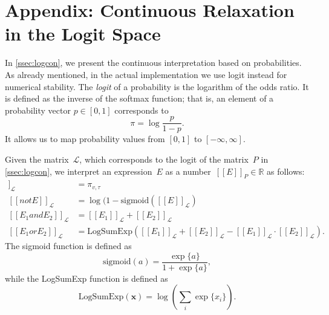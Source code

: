 \documentclass[sigplan,10pt,anonymous]{acmart} %
\newcommand{\qqpi}[2]{[\![#2]\!]_{#1}}
\theoremstyle{plain}
\theoremstyle{remark}
\theoremstyle{definition}
\begin{document}
\appendix
\section{Appendix: Continuous Relaxation in the Logit Space}\label{app:appendix-logit}

In \cref{ssec:logcon}, we present the continuous interpretation based on probabilities.
As already mentioned, in the actual implementation we use logit instead for numerical stability.
The \emph{logit} of a probability is the logarithm of the odds ratio.
It is defined as the inverse of the softmax function; that is, an element of a probability vector $p \in [0,1]$ corresponds to
\begin{equation*}
  \pi = \log \frac{p}{1 - p}.
\end{equation*}
It allows us to map probability values from $\left[ 0, 1 \right]$ to $\left[ -\infty, \infty \right]$.

Given the matrix~$\mathcal{L}$, which corresponds to the logit of the matrix~$P$ in \cref{ssec:logcon}, we interpret an expression~$E$ as a number~$\qqpi{P}{E} \in \mathbb{R}$ as  follows:
\begin{align*}
  \qqpi{\mathcal{L}}{x_v \mathrel{is} l_\tau} & = \pi_{v,\tau}                                                \\ \label{eq:logits}
  \qqpi{\mathcal{L}}{\mathrel{not} E}         & = \log(1-\text{sigmoid}(\qqpi{\mathcal{L}}{E})                \\
  \qqpi{\mathcal{L}}{E_1 \mathrel{and} E_2}   & = \qqpi{\mathcal{L}}{E_1} \mathrel{+} \qqpi{\mathcal{L}}{E_2} \\
  \qqpi{\mathcal{L}}{E_1 \mathrel{or} E_2}    & = \text{LogSumExp}(
  \qqpi{\mathcal{L}}{E_1} + \qqpi{\mathcal{L}}{E_2} - \qqpi{\mathcal{L}}{E_1} \cdot \qqpi{\mathcal{L}}{E_2}).
\end{align*}
The sigmoid function is defined as
\begin{equation*}
  \text{sigmoid}(a) = \frac{\exp\{a\}}{1 + \exp\{a\}},
\end{equation*}
while the LogSumExp function is defined as
\begin{equation*}
  \text{LogSumExp}(\bm{x}) = \log\left( \sum_i \exp\{x_i\} \right).
\end{equation*}

\end{document}
